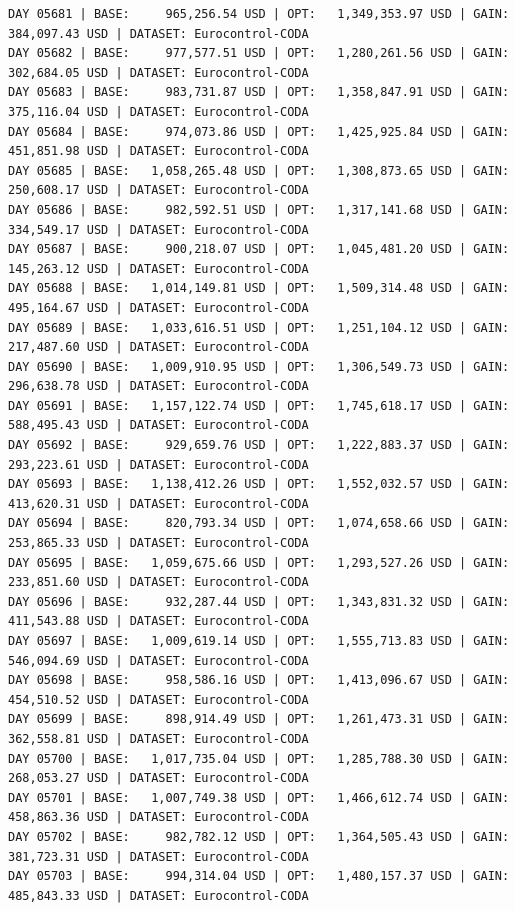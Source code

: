\documentclass[11pt,a4paper]{article}
\begin{document}
\begin{verbatim}
DAY 05681 | BASE:     965,256.54 USD | OPT:   1,349,353.97 USD | GAIN: 384,097.43 USD | DATASET: Eurocontrol-CODA
DAY 05682 | BASE:     977,577.51 USD | OPT:   1,280,261.56 USD | GAIN: 302,684.05 USD | DATASET: Eurocontrol-CODA
DAY 05683 | BASE:     983,731.87 USD | OPT:   1,358,847.91 USD | GAIN: 375,116.04 USD | DATASET: Eurocontrol-CODA
DAY 05684 | BASE:     974,073.86 USD | OPT:   1,425,925.84 USD | GAIN: 451,851.98 USD | DATASET: Eurocontrol-CODA
DAY 05685 | BASE:   1,058,265.48 USD | OPT:   1,308,873.65 USD | GAIN: 250,608.17 USD | DATASET: Eurocontrol-CODA
DAY 05686 | BASE:     982,592.51 USD | OPT:   1,317,141.68 USD | GAIN: 334,549.17 USD | DATASET: Eurocontrol-CODA
DAY 05687 | BASE:     900,218.07 USD | OPT:   1,045,481.20 USD | GAIN: 145,263.12 USD | DATASET: Eurocontrol-CODA
DAY 05688 | BASE:   1,014,149.81 USD | OPT:   1,509,314.48 USD | GAIN: 495,164.67 USD | DATASET: Eurocontrol-CODA
DAY 05689 | BASE:   1,033,616.51 USD | OPT:   1,251,104.12 USD | GAIN: 217,487.60 USD | DATASET: Eurocontrol-CODA
DAY 05690 | BASE:   1,009,910.95 USD | OPT:   1,306,549.73 USD | GAIN: 296,638.78 USD | DATASET: Eurocontrol-CODA
DAY 05691 | BASE:   1,157,122.74 USD | OPT:   1,745,618.17 USD | GAIN: 588,495.43 USD | DATASET: Eurocontrol-CODA
DAY 05692 | BASE:     929,659.76 USD | OPT:   1,222,883.37 USD | GAIN: 293,223.61 USD | DATASET: Eurocontrol-CODA
DAY 05693 | BASE:   1,138,412.26 USD | OPT:   1,552,032.57 USD | GAIN: 413,620.31 USD | DATASET: Eurocontrol-CODA
DAY 05694 | BASE:     820,793.34 USD | OPT:   1,074,658.66 USD | GAIN: 253,865.33 USD | DATASET: Eurocontrol-CODA
DAY 05695 | BASE:   1,059,675.66 USD | OPT:   1,293,527.26 USD | GAIN: 233,851.60 USD | DATASET: Eurocontrol-CODA
DAY 05696 | BASE:     932,287.44 USD | OPT:   1,343,831.32 USD | GAIN: 411,543.88 USD | DATASET: Eurocontrol-CODA
DAY 05697 | BASE:   1,009,619.14 USD | OPT:   1,555,713.83 USD | GAIN: 546,094.69 USD | DATASET: Eurocontrol-CODA
DAY 05698 | BASE:     958,586.16 USD | OPT:   1,413,096.67 USD | GAIN: 454,510.52 USD | DATASET: Eurocontrol-CODA
DAY 05699 | BASE:     898,914.49 USD | OPT:   1,261,473.31 USD | GAIN: 362,558.81 USD | DATASET: Eurocontrol-CODA
DAY 05700 | BASE:   1,017,735.04 USD | OPT:   1,285,788.30 USD | GAIN: 268,053.27 USD | DATASET: Eurocontrol-CODA
DAY 05701 | BASE:   1,007,749.38 USD | OPT:   1,466,612.74 USD | GAIN: 458,863.36 USD | DATASET: Eurocontrol-CODA
DAY 05702 | BASE:     982,782.12 USD | OPT:   1,364,505.43 USD | GAIN: 381,723.31 USD | DATASET: Eurocontrol-CODA
DAY 05703 | BASE:     994,314.04 USD | OPT:   1,480,157.37 USD | GAIN: 485,843.33 USD | DATASET: Eurocontrol-CODA

\end{verbatim}
\end{document}
